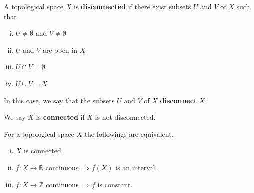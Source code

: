 \documentclass[a4paper,11pt]{article}
\begin{document}
\begin{definition}
    A topological space $X$ is \textbf{disconnected} if there exist subsets $U$ and $V$ of $X$ such that

    \begin{enumerate}[(i)]
    \item $U \neq \emptyset$ and $V \neq \emptyset$

    \item $U$ and $V$ are open in $X$

    \item $U \cap V=\emptyset$

    \item $U \cup V=X$

    \end{enumerate}

    In this case, we say that the subsets $U$ and $V$ of $X$ \textbf{disconnect} $X$.

    We say $X$ is \textbf{connected} if $X$ is not disconnected.
\end{definition}

\begin{theorem}\label{thm:connected tfae}
    For a topological space $X$ the followings are equivalent.
    \begin{enumerate}[(i)]
        \item $X$ is connected.
        \item $f: X \rightarrow \mathbb{R}$ continuous $\Longrightarrow f(X)$ is an interval.
        \item $f: X \rightarrow \mathbb{Z}$ continuous $\Longrightarrow f$ is constant.
    \end{enumerate}
\end{theorem}
\end{document}
